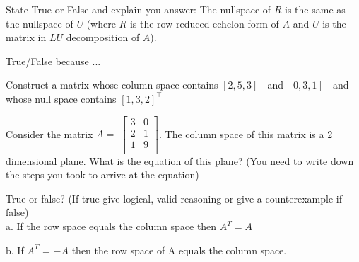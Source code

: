 \documentclass[solution,addpoints,12pt]{exam}
\begin{document}
\begin{questions}


\question[\half] State True or False and explain you answer: The nullspace of $R$ is the same as the nullspace of $U$ (where $R$ is the row reduced echelon form of $A$ and $U$ is the matrix in $LU$ decomposition of $A$). 
\begin{solution}
True/False because ...
\end{solution}

\question [1] 
Construct a matrix whose column space contains $[2, 5, 3]^\top$ and $[0, 3, 1]^\top$ and whose null space contains $[1, 3, 2]^\top$
\begin{solution}

\end{solution}


\question[2] 
Consider the matrix $A=$
$\begin{bmatrix}
3&0\\
2&1\\
1&9\\
\end{bmatrix}$. The column space of this matrix is a 2 dimensional plane. What is the equation of this plane? (You need to write down the steps you took to arrive at the equation)
\begin{solution}

\end{solution}
\question[1] True or false? (If true give logical, valid reasoning or give a counterexample if false)\\
a. If the row space equals the column space then $A^T = A$
\begin{solution}
\end{solution}
b. If $A^T$ = $-A$ then the row space of A equals the column space.
\begin{solution}
\end{solution}


\end{questions}
\end{document}
